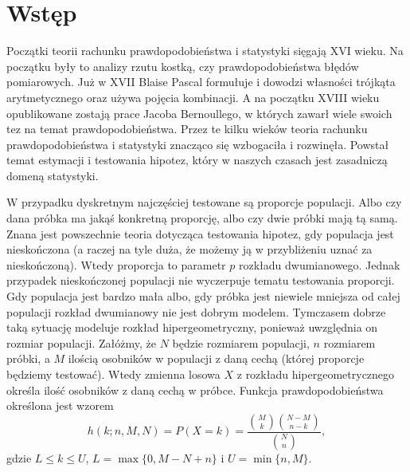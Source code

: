 \setcounter{chapter}{-1}
\chapter{Wstęp}
Początki teorii rachunku prawdopodobieństwa i statystyki sięgają XVI wieku. Na początku były to analizy rzutu kostką, czy prawdopodobieństwa błędów pomiarowych. Już w XVII Blaise Pascal formułuje i dowodzi własności trójkąta arytmetycznego oraz używa pojęcia kombinacji. A na początku XVIII wieku opublikowane zostają prace Jacoba Bernoullego, w których zawarł wiele swoich tez na temat prawdopodobieństwa. Przez te kilku wieków teoria rachunku prawdopodobieństwa i statystyki znacząco się wzbogaciła i rozwinęła. Powstał temat estymacji i testowania hipotez, który w naszych czasach jest zasadniczą domeną statystyki.

W przypadku dyskretnym najczęściej testowane są proporcje populacji. Albo czy dana próbka ma jakąś konkretną proporcję, albo czy dwie próbki mają tą samą. Znana jest powszechnie teoria dotycząca testowania hipotez, gdy populacja jest nieskończona (a raczej na tyle duża, że możemy ją w przybliżeniu uznać za nieskończoną). Wtedy proporcja to parametr $p$ rozkładu dwumianowego. Jednak przypadek nieskończonej populacji nie wyczerpuje tematu testowania proporcji. Gdy populacja jest bardzo mała albo, gdy próbka jest niewiele mniejsza od całej populacji rozkład dwumianowy nie jest dobrym modelem. Tymczasem dobrze taką sytuację modeluje rozkład hipergeometryczny, ponieważ uwzględnia on rozmiar populacji. Załóżmy, że $N$ będzie rozmiarem populacji, $n$ rozmiarem próbki, a $M$ ilością osobników w populacji z daną cechą (której proporcje będziemy testować). Wtedy zmienna losowa $X$ z rozkładu hipergeometrycznego określa ilość osobników z daną cechą w próbce. Funkcja prawdopodobieństwa określona jest wzorem
\begin{equation}
h(k;n,M,N) = P(X=k) = \frac{\binom{M}{k} \binom{N-M}{n-k}}{\binom{N}{n}},
\end{equation}
gdzie $L\leq k\leq U$, $L=\max\{0,M-N+n\}$ i $U=\min\{n,M\}$.

